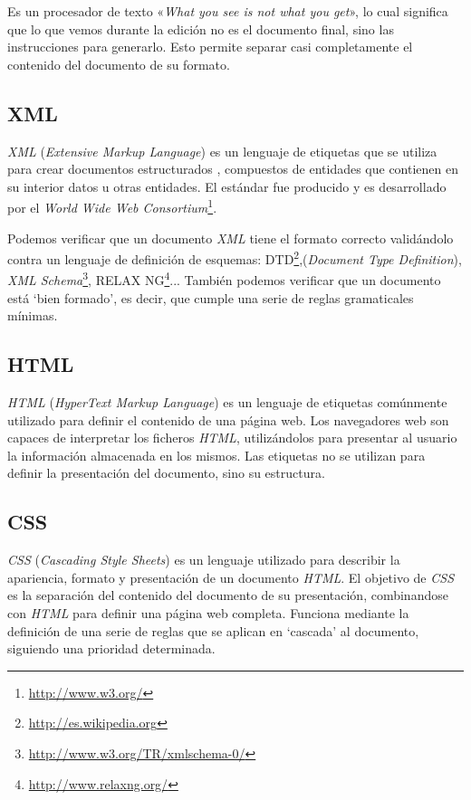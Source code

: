 Es un procesador de texto «\emph{What you see is not what you get}», lo cual significa que lo que vemos durante la edición no es el 
documento final, sino las instrucciones para generarlo.
Esto permite separar casi completamente el contenido del documento de su formato.

\subsection{XML}
\emph{XML} (\emph{Extensive Markup Language}) es un lenguaje de etiquetas que se utiliza para crear documentos estructurados \cite{website:xml}, compuestos de entidades que contienen en su interior datos u otras entidades.
El estándar fue producido y es desarrollado por el \emph{World Wide Web Consortium}\footnote{\url{http://www.w3.org/}}.

Podemos verificar que un documento \emph{XML} tiene el formato correcto validándolo contra un lenguaje de definición de esquemas: DTD\footnote{\url{http://es.wikipedia.org}},(\emph{Document Type Definition}), \emph{XML Schema}\footnote{\url{http://www.w3.org/TR/xmlschema-0/}}, RELAX NG\footnote{\url{http://www.relaxng.org/}}...
También podemos verificar que un documento está `bien formado', es decir, que cumple una serie de reglas gramaticales mínimas.

\subsection{HTML}
\emph{HTML} (\emph{HyperText Markup Language}) es un lenguaje de etiquetas comúnmente utilizado para definir el contenido de una página web.
Los navegadores web son capaces de interpretar los ficheros \emph{HTML}, utilizándolos para presentar al usuario la información almacenada en los mismos.
Las etiquetas no se utilizan para definir la presentación del documento, sino su estructura.

\subsection{CSS}
\emph{CSS} (\emph{Cascading Style Sheets}) es un lenguaje utilizado para describir la apariencia, formato y presentación de un documento \emph{HTML}.
El objetivo de \emph{CSS} es la separación del contenido del documento de su presentación, combinandose con \emph{HTML} para definir una página web completa.
Funciona mediante la definición de una serie de reglas que se aplican en `cascada' al documento, siguiendo una prioridad determinada.

